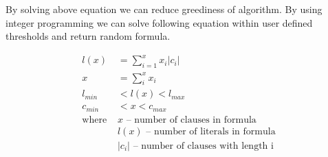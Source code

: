 By solving above equation we can reduce greediness of algorithm. By using integer programming we can solve following equation within user defined thresholds and return random formula.

\begin{align*}
	l(x) &= \sum_{i=1}^{x} x_i |c_i| \\
	x &= \sum_i^x x_i \\
	l_{min} &< l(x) < l_{max} \\
	c_{min} &< x < c_{max} \\
	\text{where }
		&x \text{ -- number of clauses in formula} \\
		&l(x) \text{ -- number of literals in formula} \\
		&|c_i| \text{ -- number of clauses with length i} \\
\end{align*}
